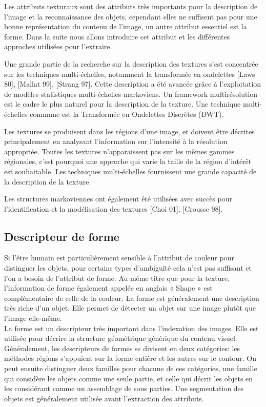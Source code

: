 Les attributs texturaux sont des attributs très importants pour la description de l'image et la
reconnaissance des objets, cependant elles ne suffisent pas pour une bonne représentation du
contenu de l'image, un autre attribut essentiel est la forme.
Dans la suite nous allons introduire cet attribut et les différentes approches utilisées pour
l'extraire.


Une grande partie de la recherche sur la description des textures s'est concentrée sur les techniques multi-échelles, notamment la transformée en ondelettes [Laws 80], [Mallat 99], [Strang 97]. Cette description a été avancée grâce à l'exploitation de modèles statistiques multi-échelles markoviens. Un framework multirésolution est le cadre le plus naturel pour la description de la texture. Une technique multi-échelles commune est la Transformée en Ondelettes Discrètes (DWT).

Les textures se produisent dans les régions d'une image, et doivent être décrites principalement en analysant l'information sur l'intensité à la résolution appropriée. Toutes les textures n'apparaissent pas sur les mêmes gammes régionales, c'est pourquoi une approche qui varie la taille de la région d'intérêt est souhaitable. Les techniques multi-échelles fournissent une grande capacité de la description de la texture.

Les structures markoviennes ont également été utilisées avec succès pour l'identification et la modélisation des textures [Choi 01], [Crousse 98].

\subsection{Descripteur de forme}
Si l'être humain est particulièrement sensible à l'attribut de couleur pour distinguer les
objets, pour certains types d'ambiguïté cela n'est pas suffisant et l'on a besoin de l'attribut de forme. Au même titre que pour la texture, l’information de forme également appelée en anglais « Shape » est complémentaire de celle de la couleur. La forme est généralement une description très riche d’un objet. Elle permet de détecter un objet sur une image plutôt que l’image elle-même.\\

La forme est un descripteur très important dans l'indexation des images. Elle est utilisée pour décrire la structure géométrique générique du contenu visuel. Généralement, les descripteurs de formes se divisent en deux catégories: les méthodes régions s'appuient sur la forme entière et les autres sur le contour. On peut ensuite distinguer deux familles pour chacune de ces catégories, une famille qui considère les objets comme une seule partie, et celle qui décrit les objets en les considérant comme un assemblage de sous parties. Une segmentation des objets est généralement utilisée avant l’extraction des attributs.

